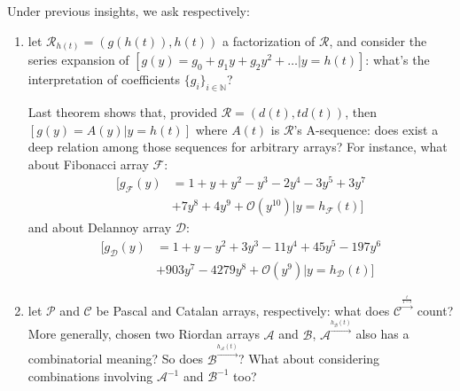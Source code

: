 \documentclass[11pt,a4paper]{article} %
\begin{document}
    Under previous insights, we ask respectively:
    \begin{enumerate}
        \item let $\mathcal{R}_{h(t)}=\left(g(h(t)), h(t)\right)$ a factorization of $\mathcal{R}$,
            and consider the series expansion of $[g(y)=g_0 + g_1 y + g_2 y^2 + \ldots|y=h(t)]$: 
            what's the interpretation of coefficients $\lbrace g_i\rbrace_{i\in\mathbb{N}}$? 
            
            Last theorem shows that, provided $\mathcal{R}=\left(d(t), td(t)\right)$, then 
            $[g(y)=A(y)|y=h(t)]$ where $A(t)$ is $\mathcal{R}$'s A-sequence: 
            does exist a deep relation among those sequences for arbitrary arrays?   
            For instance, what about Fibonacci array $\mathcal{F}$: 
            \begin{displaymath}
                \begin{split}
                    \big[ g_{\mathcal{F}}(y) &= 1 + y + y^{2} - y^{3} -2y^{4} 
                    -3 y^{5}  +3 y^{7} \\
                    &+7 y^{8} +4 y^{9} + \mathcal{O}\left(y^{10}\right) | y=h_{\mathcal{F}}(t) \big]
                \end{split}
            \end{displaymath}
            and about Delannoy array $\mathcal{D}$: 
            \begin{displaymath}
                \begin{split}
                    \big[ g_{\mathcal{D}}(y) &= 1 + y - y^{2} + 3 y^{3} -11y^{4} + 45 y^{5} -197y^{6}\\ 
                    &+ 903 y^{7} -4279y^{8} + \mathcal{O}\left(y^{9}\right)| y=h_{\mathcal{D}}(t) \big]
                \end{split}
            \end{displaymath}
        \item let $\mathcal{P}$ and $\mathcal{C}$ be Pascal and Catalan arrays, respectively: 
            what does $\mathcal{C}^{\stackrel{\frac{t}{1-t}}{\rightarrow}}$ count? 
            More generally, chosen two Riordan arrays $\mathcal{A}$ and $\mathcal{B}$, 
            $\mathcal{A}^{\stackrel{h_{\mathcal{B}}(t)}{\rightarrow}}$ also has a combinatorial meaning? 
            So does $\mathcal{B}^{\stackrel{h_{\mathcal{A}}(t)}{\rightarrow}}$? What about considering
            combinations involving  $\mathcal{A}^{-1}$ and $\mathcal{B}^{-1}$ too?



\end{enumerate}
\end{document}
